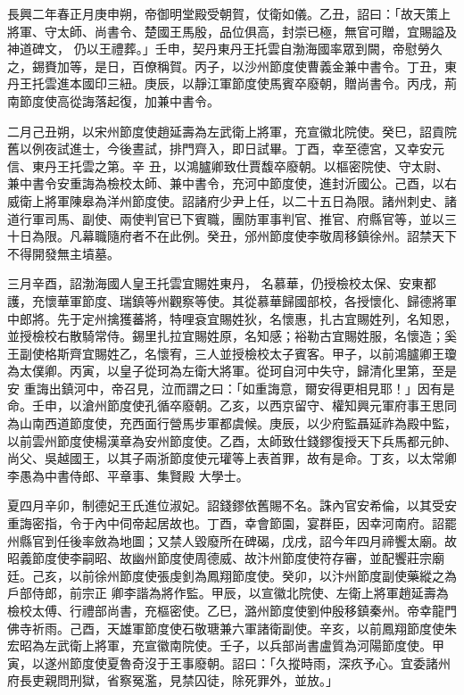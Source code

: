 
\begin{pinyinscope}

 長興二年春正月庚申朔，帝御明堂殿受朝賀，仗衛如儀。乙丑，詔曰：「故天策上將軍、守太師、尚書令、楚國王馬殷，品位俱高，封崇已極，無官可贈，宜賜謚及神道碑文，
 仍以王禮葬。」壬申，契丹東丹王托雲自渤海國率眾到闕，帝慰勞久之，錫賚加等，是日，百僚稱賀。丙子，以沙州節度使曹義金兼中書令。丁丑，東丹王托雲進本國印三紐。庚辰，以靜江軍節度使馬賓卒廢朝，贈尚書令。丙戌，荊南節度使高從誨落起復，加兼中書令。



 二月己丑朔，以宋州節度使趙延壽為左武衛上將軍，充宣徽北院使。癸巳，詔貢院舊以例夜試進士，今後晝試，排門齊入，即日試畢。丁酉，幸至德宮，又幸安元信、東丹王托雲之第。辛
 丑，以鴻臚卿致仕賈馥卒廢朝。以樞密院使、守太尉、兼中書令安重誨為檢校太師、兼中書令，充河中節度使，進封沂國公。己酉，以右威衛上將軍陳皋為洋州節度使。詔諸府少尹上任，以二十五日為限。諸州刺史、諸道行軍司馬、副使、兩使判官已下賓職，團防軍事判官、推官、府縣官等，並以三十日為限。凡幕職隨府者不在此例。癸丑，邠州節度使李敬周移鎮徐州。詔禁天下不得開發無主墳墓。



 三月辛酉，詔渤海國人皇王托雲宜賜姓東丹，
 名慕華，仍授檢校太保、安東都護，充懷華軍節度、瑞鎮等州觀察等使。其從慕華歸國部校，各授懷化、歸德將軍中郎將。先于定州擒獲蕃將，特哩袞宜賜姓狄，名懷惠，扎古宜賜姓列，名知恩，並授檢校右散騎常侍。錫里扎拉宜賜姓原，名知感；裕勒古宜賜姓服，名懷造；奚王副使格斯齊宜賜姓乙，名懷宥，三人並授檢校太子賓客。甲子，以前鴻臚卿王瓊為太僕卿。丙寅，以皇子從珂為左衛大將軍。從珂自河中失守，歸清化里第，至是安
 重誨出鎮河中，帝召見，泣而謂之曰：「如重誨意，爾安得更相見耶！」因有是命。壬申，以滄州節度使孔循卒廢朝。乙亥，以西京留守、權知興元軍府事王思同為山南西道節度使，充西面行營馬步軍都虞候。庚辰，以少府監聶延祚為殿中監，以前雲州節度使楊漢章為安州節度使。乙酉，太師致仕錢鏐復授天下兵馬都元帥、尚父、吳越國王，以其子兩浙節度使元瓘等上表首罪，故有是命。丁亥，以太常卿李愚為中書侍郎、平章事、集賢殿
 大學士。



 夏四月辛卯，制德妃王氏進位淑妃。詔錢鏐依舊賜不名。誅內官安希倫，以其受安重誨密指，令于內中伺帝起居故也。丁酉，幸會節園，宴群臣，因幸河南府。詔罷州縣官到任後率斂為地圖；又禁人毀廢所在碑碣，戊戌，詔今年四月禘饗太廟。故昭義節度使李嗣昭、故幽州節度使周德威、故汴州節度使符存審，並配饗莊宗廟廷。己亥，以前徐州節度使張虔釗為鳳翔節度使。癸卯，以汴州節度副使藥縱之為戶部侍郎，前宗正
 卿李諧為將作監。甲辰，以宣徽北院使、左衛上將軍趙延壽為檢校太傅、行禮部尚書，充樞密使。乙巳，潞州節度使劉仲殷移鎮秦州。帝幸龍門佛寺祈雨。己酉，天雄軍節度使石敬瑭兼六軍諸衛副使。辛亥，以前鳳翔節度使朱宏昭為左武衛上將軍，充宣徽南院使。壬子，以兵部尚書盧質為河陽節度使。甲寅，以遂州節度使夏魯奇沒于王事廢朝。詔曰：「久摐時雨，深疚予心。宜委諸州府長吏親問刑獄，省察冤濫，見禁囚徒，除死罪外，並放。」




\end{pinyinscope}
